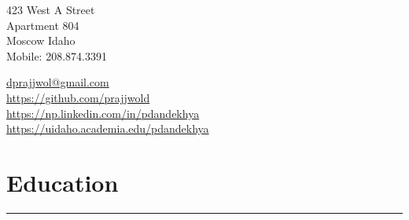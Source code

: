 \documentclass[]{deedy-resume-openfont}
\begin{document}
%
%
\lastupdated

%
%



{
\begin{minipage}[t]{.5\linewidth}
423 West A Street\\
Apartment 804\\
Moscow Idaho\\
Mobile: 208.874.3391
\end{minipage}
\hfill
\begin{minipage}[t]{.38\linewidth}
{ 
\raggedleft{} \href{mailto:dprajjwol@gmail.com}{dprajjwol@gmail.com}\\
\raggedleft{} \href{https://github.com/prajjwold}{https://github.com/prajjwold}\\
\raggedleft{} \href{https://np.linkedin.com/in/pdandekhya}{https://np.linkedin.com/in/pdandekhya}\\
\raggedleft{} \href{https://uidaho.academia.edu/pdandekhya}{https://uidaho.academia.edu/pdandekhya}\\
}
\end{minipage}
}


\section{Education}

\sectionsep


\rule[2.5mm]{\textwidth}{0.4pt}
\end{document}
